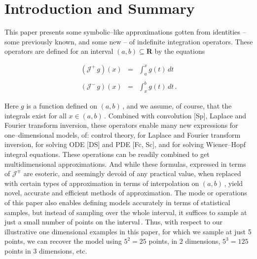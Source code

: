 \documentclass[11pt]{article}
\begin{document}
\section{Introduction and Summary}%
\setcounter{equation}{0}

\vspace{.1in} \noindent This paper presents some symbolic--like
approximations gotten from identities -- some previously known, and
some new -- of indefinite integration operators.  These operators are
defined for an interval $(a,b) \subseteq {\mathbf R}$ by the equations

\begin{equation}%
  \begin{array}{rcl}
    ({\mathcal J}^+\,g)(x) & = & \displaystyle \int_a^x g(t) \, dt \\
    && \\
    ({\mathcal J}^-\,g)(x) & = & \displaystyle \int_x^b g(t) \, dt\,.
    \label{equation:1.1}
    \end{array}
\end{equation}
                                                                  
\noindent Here $g$ is a function defined on $(a,b)$\,, and we assume,
of course, that the integrals exist for all $x \in (a,b)$\,.  Combined
with convolution [Sp], Laplace and Fourier transform inversion, these
operators enable many new expressions for one--dimensional models, of:
control theory, for Laplace and Fourier transform inversion, for
solving ODE [DS] and PDE [Fc, Sc], and for solving Wiener--Hopf
integral equations.  These operations can be readily combined to get
multidimensional approximations.  And while these formulas, expressed
in terms of ${\mathcal J}^\mp$ are esoteric, and seemingly devoid of
any practical value, when replaced with certain types of approximation
in terms of interpolation on $(a,b)$\,, yield novel, accurate and
efficient methods of approximation.  The mode or operations of this
paper also enables defining models accurately in terms of statistical
samples, but instead of sampling over the whole interval, it suffices
to sample at just a small number of points on the interval\,.  Thus,
with respect to our illustrative one dimensional examples in this
paper, for which we sample at just 5 points, we can recover the model
using $5^2 = 25$ points, in $2$ dimensions, $5^3 = 125$ points in $3$
dimensions, etc.
\end{document}
